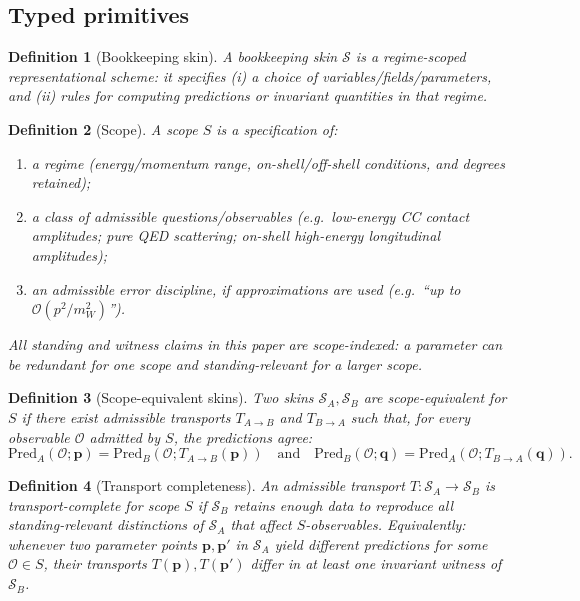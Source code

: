 \documentclass[11pt]{article}
\newtheorem{definition}{Definition}[section]
\theoremstyle{remark}
\newcommand{\cO}{\mathcal{O}}
\newcommand{\Skin}{\mathcal{S}}
\begin{document}
\subsection{Typed primitives}

\begin{definition}[Bookkeeping skin]\label{def:skin}
A \emph{bookkeeping skin} $\Skin$ is a regime-scoped representational scheme: it specifies
(i) a choice of variables/fields/parameters, and (ii) rules for computing predictions or invariant
quantities in that regime.
\end{definition}



\begin{definition}[Scope]\label{def:scope}
A \emph{scope} $S$ is a specification of:
\begin{enumerate}[label=(\roman*),leftmargin=2.2em]
\item a regime (energy/momentum range, on-shell/off-shell conditions, and degrees retained);
\item a class of admissible questions/observables (e.g.\ low-energy CC contact amplitudes; pure QED
scattering; on-shell high-energy longitudinal amplitudes);
\item an admissible error discipline, if approximations are used (e.g.\ ``up to $\cO(p^2/m_W^2)$'').
\end{enumerate}
All standing and witness claims in this paper are \emph{scope-indexed}: a parameter can be redundant for
one scope and standing-relevant for a larger scope.
\end{definition}

\begin{definition}[Scope-equivalent skins]\label{def:scope-equivalent}
Two skins $\Skin_A,\Skin_B$ are \emph{scope-equivalent} for $S$ if there exist admissible transports
$T_{A\to B}$ and $T_{B\to A}$ such that, for every observable $\mathcal{O}$ admitted by $S$,
the predictions agree:
\[
\mathrm{Pred}_{A}(\mathcal{O};\mathbf{p})=\mathrm{Pred}_{B}(\mathcal{O};T_{A\to B}(\mathbf{p}))
\quad\text{and}\quad
\mathrm{Pred}_{B}(\mathcal{O};\mathbf{q})=\mathrm{Pred}_{A}(\mathcal{O};T_{B\to A}(\mathbf{q})).
\]
\end{definition}

\begin{definition}[Transport completeness]\label{def:transport-complete}
An admissible transport $T:\Skin_A\to\Skin_B$ is \emph{transport-complete} for scope $S$ if $\Skin_B$
retains enough data to reproduce \emph{all} standing-relevant distinctions of $\Skin_A$ that affect
$S$-observables. Equivalently: whenever two parameter points $\mathbf{p},\mathbf{p}'$ in $\Skin_A$ yield
different predictions for some $\mathcal{O}\in S$, their transports $T(\mathbf{p}),T(\mathbf{p}')$ differ
in at least one invariant witness of $\Skin_B$.
\end{definition}
\end{document}

